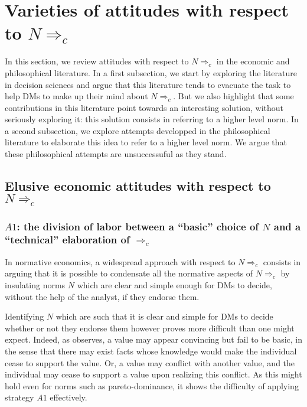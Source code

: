 \documentclass[preprint, french, english, 11pt, authoryear]{elsarticle}%
\newcommand{\protectforpdf}[1]{\texorpdfstring{\ensuremath{#1}}{#1}}
\begin{document}
\section{Varieties of attitudes with respect to \protectforpdf{N ⇒_c}}
\label{sec:existing}
In this section, we review attitudes with respect to $N ⇒_c$ in the economic and philosophical literature. In a first subsection, we start by exploring the literature in decision sciences and argue that this literature tends to evacuate the task to help \acp{DM} to make up their mind about $N ⇒_c$. But we also highlight that some contributions in this literature point towards an interesting solution, without seriously exploring it: this solution consists in referring to a higher level norm. In a second subsection, we explore attempts developped in the philosophical literature to elaborate this idea to refer to a higher level norm. We argue that these philosophical attempts are unsuccessuful as they stand.

\subsection{Elusive economic attitudes with respect to \protectforpdf{N ⇒_c}}
\subsubsection{\protectforpdf{A1}: the division of labor between a ``basic'' choice of \protectforpdf{N} and a ``technical'' elaboration of \protectforpdf{⇒_c}}

In normative economics, a widespread approach with respect to $N ⇒_c$ consists in arguing that it is possible to condensate all the normative aspects of $N ⇒_c$  by insulating norms $N$ which are clear and simple enough for \acp{DM} to decide, without the help of the analyst, if they endorse them.

Identifying $N$ which are such that it is clear and simple for \acp{DM} to decide whether or not they endorse them however proves more difficult than one might expect. Indeed, as \citet{sen_nature_1967} observes, a value may appear convincing but fail to be basic, in the sense that there may exist facts whose knowledge would make the individual cease to support the value. Or, a value may conflict with another value, and the individual may cease to support a value upon realizing this conflict. As this might hold even for norms such as pareto-dominance, it shows the difficulty of applying strategy $A1$ effectively.
\end{document}
